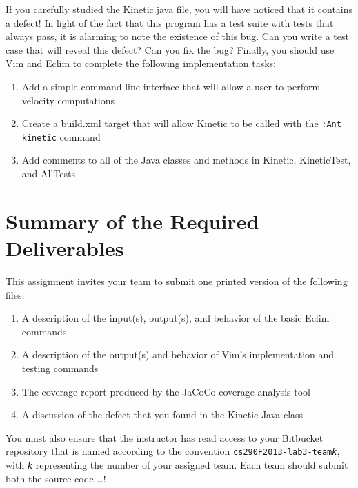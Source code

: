 If you carefully studied the Kinetic.java file, you will have noticed that it contains a defect! In light of the fact
that this program has a test suite with tests that always pass, it is alarming to note the existence of this bug. 
Can you write a test case that will reveal this defect? Can you fix the bug?  Finally, you should use Vim and Eclim to
complete the following implementation tasks:

\vspace*{-.1in}
\begin{enumerate}
	\item Add a simple command-line interface that will allow a user to perform velocity computations
	\item Create a build.xml target that will allow Kinetic to be called with the {\tt :Ant kinetic} command
	\item Add comments to all of the Java classes and methods in Kinetic, KineticTest, and AllTests
\end{enumerate}

\section*{Summary of the Required Deliverables}

This assignment invites your team to submit one printed version of the following files:

\begin{enumerate}
	
	\item A description of the input(s), output(s), and behavior of the basic Eclim commands 
	\item A description of the output(s) and behavior of Vim's implementation and testing commands
	\item The coverage report produced by the JaCoCo coverage analysis tool
	\item A discussion of the defect that you found in the Kinetic Java class

\end{enumerate}

You must also ensure that the instructor has read access to your Bitbucket repository that is named according to the
convention {\tt cs290F2013-lab3-team{\em k}}, with {\tt {\em k}} representing the number of your assigned team. 
Each team should submit both the source code \ldots !


